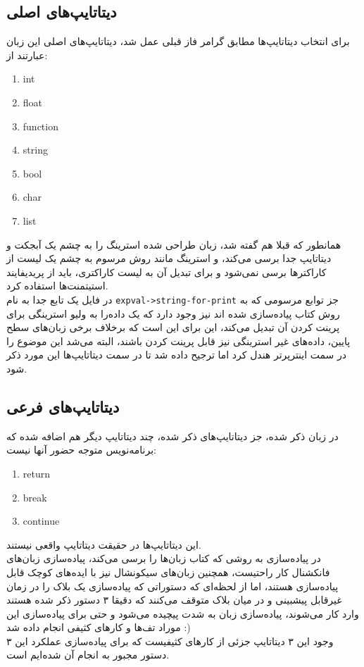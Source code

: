 \documentclass{article}
\begin{document}
\subsection{دیتاتایپ‌های اصلی}
برای انتخاب دیتا‌تایپ‌ها مطابق گرامر فاز قبلی عمل شد، دیتا‌تایپ‌های اصلی این زبان عبارتند از:
\begin{enumerate}
        \item int
        \item float 
        \item function 
        \item string
        \item bool 
        \item char
        \item list
\end{enumerate}
همانطور که قبلا هم گفته شد، زبان طراحی شده استرینگ را به چشم یک آبجکت و دیتاتایپ جدا برسی می‌کند، و استرینگ مانند روش مرسوم به چشم یک لیست از 
کاراکتر‌ها 
برسی نمی‌شود و برای تبدیل آن به لیست کاراکتری، باید از پریدیفایند استیتمنت‌ها استفاده کرد.
\\
در فایل
یک تابع جدا به نام 
\texttt{expval->string-for-print}
جز توابع مرسومی که به روش کتاب پیاده‌سازی شده اند نیز وجود دارد که یک داده‌را به ولیو استرینگی برای پرینت کردن آن تبدیل می‌کند، 
این برای این است که برخلاف برخی زبان‌های سطح پایین، داده‌های غیر استرینگی نیز قابل پرینت کردن باشند، البته می‌شد این موضوع را در سمت اینترپرتر هندل کرد اما ترجیح داده شد تا 
در سمت دیتاتایپ‌ها این مورد ذکر شود.
\subsection{دیتا‌تایپ‌های فرعی}
در زبان ذکر شده، جز دیتاتایپ‌های ذکر شده، چند دیتاتایپ دیگر هم اضافه شده که برنامه‌نویس متوجه حضور آنها نیست:
\begin{enumerate}
        \item return 
        \item break 
        \item continue
\end{enumerate}
این دیتاتایپ‌ها در حقیقت دیتاتایپ واقعی نیستند.
\\
در پیاده‌سازی به روشی که کتاب زبان‌ها را برسی می‌کند، پیاده‌سازی زبان‌های فانکشنال کار راحتیست، همچنین زبان‌های سیکونشال نیز 
با ایده‌های کوچک قابل پیاده‌سازی هستند، اما از لحظه‌ای که دستوراتی که پیاده‌سازی یک بلاک را در زمان غیرقابل پیشبینی و در میان بلاک متوقف می‌کنند
که دقیقا ۳ دستور ذکر شده هستند وارد کار می‌شوند، پیاده‌سازی زبان به شدت پیچیده‌ می‌شود و حتی برای پیاده‌سازی این موراد تف‌ها و کار‌های کثیفی انجام داده شد :)
\\
وجود این ۳ دیتاتایپ جزئی از کار‌های کثیفیست که برای پیاده‌سازی عملکرد این ۳ دستور مجبور به انجام آن شده‌ایم است.
\end{document}
